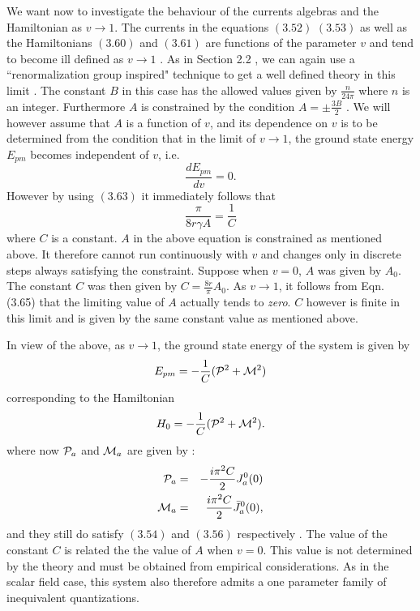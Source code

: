 \documentclass[a4paper,12pt]{article}
\begin{document}
We want now to investigate the behaviour of the 
currents algebras and the Hamiltonian as $v \rightarrow 1$.
The currents in the equations $(3.52)$ $(3.53)$ as well as the
 Hamiltonians $(3.60)$ and $(3.61)$ are functions of the parameter
$v$ and tend to become ill defined as $v \rightarrow 1$ . As in Section 
2.2 , we can again use a
``renormalization group inspired" technique to get
 a well defined theory in this limit . The  constant $B$ in this case 
has the allowed values given by $\frac{n}{24{\pi}}$ where $n$ is an
integer. Furthermore $A$ is constrained by the condition
$A={\pm}{\frac{3B}{2}}$ . We will however 
 assume that $A$ is a function of $v$,
and its dependence on $v$ is to be determined from the condition that
in the limit of $v \rightarrow 1$, the ground state energy $E_{pm}$ becomes
independent of $v$, i.e.
\begin{equation}
\frac{dE_{pm}}{dv} = 0.
\end{equation}
However by using $(3.63)$ it immediately follows that 
\begin{equation}
\frac{{\pi}}{8r{\gamma}A}= \frac{1}{C}
\end{equation}
where $C$ is a constant. 
$A$ in the above equation is constrained as mentioned above.
It therefore cannot run continuously with $v$ and changes only in discrete
steps always satisfying the constraint. Suppose when $v = 0$, $A$ was given by
 $A_0$. The constant $C$ was then given by 
$C = \frac{8r}{\pi}A_0$. As  $v \rightarrow 1$, it follows from Eqn. (3.65)
that the limiting value of $A$ actually tends to {\it zero}. $C$ however is
finite in this limit and is 
given by the same constant value as mentioned above.


In view of the above, as $v \rightarrow 1$, the 
ground state energy of the system is given by 
\begin{equation}
E_{pm}=-\frac{1}{C}({\cal P}^2 + {\cal M}^2)
\end{equation}
 corresponding to the Hamiltonian 
\begin{equation}
H_{0}=-\frac{1}{C}({\cal P}^2 + {\cal M}^2).
\end{equation}
where now ${\cal P}_a$ and ${\cal M}_a$ are given by :
\begin{eqnarray}
{\cal P}_a&=&-\frac{i{\pi}^2 C}{2}J^{0}_a(0) \nonumber\\
{\cal M}_a&=&\frac{i{\pi}^2 C}{2}{\bar{J}}^{0}_{a}(0),
\end{eqnarray}
and they still do satisfy $(3.54)$ and $(3.56)$ respectively .
The value of the constant $C$ is related the the value of $A$ when $v = 0$.
This value is not determined by the theory and must be obtained from
empirical considerations. 
As in the scalar field case, this system also therefore admits a one
parameter family of inequivalent quantizations.
\end{document}
